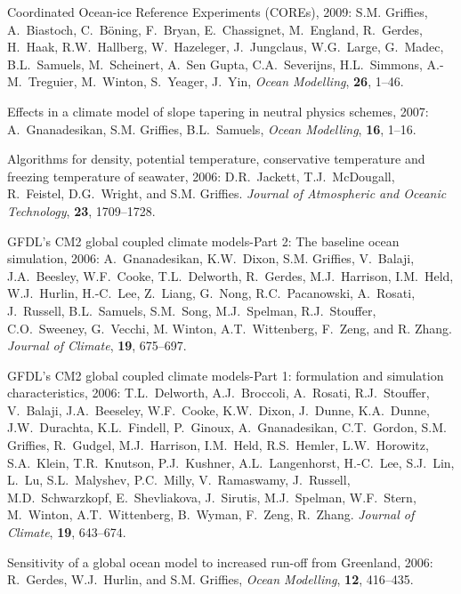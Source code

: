 \begin{etaremune}
\item Coordinated Ocean-ice Reference Experiments (COREs), 2009: S.M. Grif\/f\/ies, A.\ Biastoch, C.\ B\"{o}ning, F.\ Bryan, E.\
  Chassignet, M.\ England, R.\ Gerdes, H.\ Haak, R.W.\ Hallberg, W.\
  Hazeleger, J.\ Jungclaus, W.G.\ Large, G.\ Madec, B.L.\ Samuels, M.\
  Scheinert, A.\ Sen Gupta, C.A.\ Severijns, H.L.\ Simmons, A.-M.\
  Treguier, M.\ Winton, S.\ Yeager, J.\ Yin,  {\em Ocean Modelling},
  {\bf 26}, 1--46.  

\item Effects in a climate model of slope tapering in neutral physics
schemes, 2007: A.\ Gnanadesikan, S.M. Grif\/f\/ies, B.L.\
Samuels, {\em Ocean Modelling}, {\bf 16}, 1--16.
  
\item Algorithms for density, potential temperature, conservative
  temperature and freezing temperature of seawater, 2006: D.R.\
  Jackett, T.J.\ McDougall, R.\ Feistel, D.G.\ Wright, and S.M. Grif\/f\/ies.  {\em Journal of Atmospheric and Oceanic
    Technology}, {\bf 23}, 1709--1728.

\item GFDL's CM2 global coupled climate models-Part 2: The baseline
  ocean simulation, 2006: A.\ Gnanadesikan, K.W.\ Dixon, S.M. Grif\/f\/ies, V.\ Balaji, J.A.\ Beesley, W.F.\ Cooke, T.L.\ Delworth,
  R.\ Gerdes, M.J.\ Harrison, I.M.\ Held, W.J.\ Hurlin, H.-C.\ Lee,
  Z.\ Liang, G.\ Nong, R.C.\ Pacanowski, A.\ Rosati, J.\ Russell,
  B.L.\ Samuels, S.M.\ Song, M.J.\ Spelman, R.J.\ Stouffer, C.O.\
  Sweeney, G.\ Vecchi, M. Winton, A.T.\ Wittenberg, F.\ Zeng, and
  R. Zhang.  {\em Journal of Climate}, {\bf 19}, 675--697.

\item GFDL's CM2 global coupled climate models-Part 1: formulation and
  simulation characteristics, 2006: T.L.\ Delworth, A.J.\ Broccoli,
  A.\ Rosati, R.J.\ Stouffer, V.\ Balaji, J.A.\ Beeseley, W.F.\ Cooke,
  K.W.\ Dixon, J.\ Dunne, K.A.\ Dunne, J.W.\ Durachta, K.L.\ Findell,
  P.\ Ginoux, A.\ Gnanadesikan, C.T.\ Gordon, 
  S.M. Grif\/f\/ies,
  R.\ Gudgel, M.J.\ Harrison, I.M.\ Held, R.S.\ Hemler, L.W.\
  Horowitz, S.A.\ Klein, T.R.\ Knutson, P.J.\ Kushner, A.L.\
  Langenhorst, H.-C.\ Lee, S.J.\ Lin, L.\ Lu, S.L.\ Malyshev, P.C.\
  Milly, V.\ Ramaswamy, J.\ Russell, M.D.\ Schwarzkopf, E.\
  Shevliakova, J.\ Sirutis, M.J.\ Spelman, W.F.\ Stern, M.\ Winton,
  A.T.\ Wittenberg, B.\ Wyman, F.\ Zeng, R.\ Zhang.  {\em Journal of
    Climate}, {\bf 19}, 643--674.

\item Sensitivity of a global ocean model to increased run-off from
Greenland, 2006: R.\ Gerdes, W.J.\ Hurlin, and 
S.M. Grif\/f\/ies,
{\em Ocean Modelling}, {\bf 12}, 416--435.
  

\end{etaremune}
